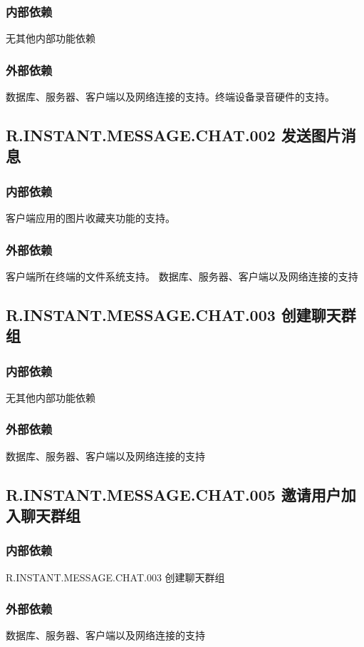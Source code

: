 \subsubsection{内部依赖}
    无其他内部功能依赖
\subsubsection{外部依赖}
    数据库、服务器、客户端以及网络连接的支持。终端设备录音硬件的支持。

\subsection{R.INSTANT.MESSAGE.CHAT.002 发送图片消息}
\subsubsection{内部依赖}
    客户端应用的图片收藏夹功能的支持。
\subsubsection{外部依赖}
    客户端所在终端的文件系统支持。
    数据库、服务器、客户端以及网络连接的支持

\subsection{R.INSTANT.MESSAGE.CHAT.003 创建聊天群组}
\subsubsection{内部依赖}
    无其他内部功能依赖
\subsubsection{外部依赖}
    数据库、服务器、客户端以及网络连接的支持

\subsection{R.INSTANT.MESSAGE.CHAT.005 邀请用户加入聊天群组}
\subsubsection{内部依赖}
    R.INSTANT.MESSAGE.CHAT.003 创建聊天群组
\subsubsection{外部依赖}
    数据库、服务器、客户端以及网络连接的支持

